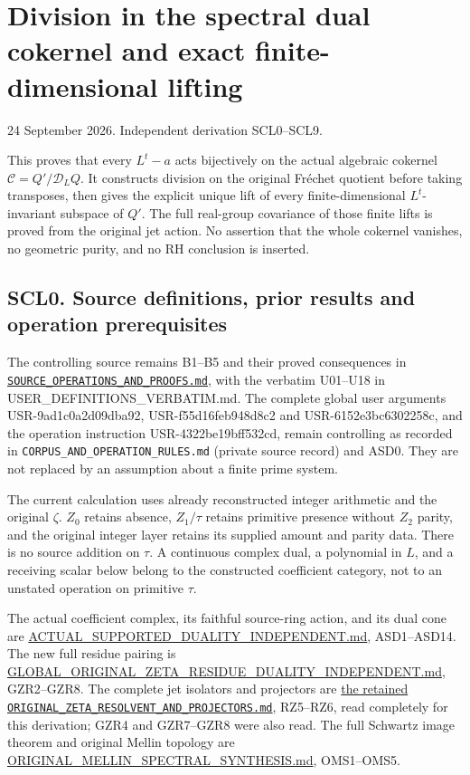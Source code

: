 \section{Division in the spectral dual cokernel and exact
finite-dimensional
lifting}\label{division-in-the-spectral-dual-cokernel-and-exact-finite-dimensional-lifting}

24 September 2026. Independent derivation SCL0--SCL9.

This proves that every \(L^t-a\) acts bijectively on the actual
algebraic cokernel \(\mathscr C=Q'/\mathcal D_LQ\). It constructs
division on the original Fréchet quotient before taking transposes, then
gives the explicit unique lift of every finite-dimensional
\(L^t\)-invariant subspace of \(Q'\). The full real-group covariance of
those finite lifts is proved from the original jet action. No assertion
that the whole cokernel vanishes, no geometric purity, and no RH
conclusion is inserted.

\subsection{SCL0. Source definitions, prior results and operation
prerequisites}\label{scl0.-source-definitions-prior-results-and-operation-prerequisites}

The controlling source remains B1--B5 and their proved consequences in
\href{../foundations/user_definitions_20260924/SOURCE_OPERATIONS_AND_PROOFS.md}{\nolinkurl{SOURCE_OPERATIONS_AND_PROOFS.md}},
with the verbatim U01--U18 in
{USER\_DEFINITIONS\_VERBATIM.md}.
The complete global user arguments USR-9ad1c0a2d09dba92,
USR-f55d16feb948d8c2 and USR-6152e3bc6302258c, and the operation
instruction USR-4322be19bff532cd, remain controlling as recorded in
\nolinkurl{CORPUS_AND_OPERATION_RULES.md} (private source record) and ASD0. They are not replaced by
an assumption about a finite prime system.

The current calculation uses already reconstructed integer arithmetic
and the original \(\zeta\). \(Z_0\) retains absence, \(Z_1/\tau\)
retains primitive presence without \(Z_2\) parity, and the original
integer layer retains its supplied amount and parity data. There is no
source addition on \(\tau\). A continuous complex dual, a polynomial in
\(L\), and a receiving scalar below belong to the constructed
coefficient category, not to an unstated operation on primitive
\(\tau\).

The actual coefficient complex, its faithful source-ring action, and its
dual cone are \url{ACTUAL_SUPPORTED_DUALITY_INDEPENDENT.md},
ASD1--ASD14. The new full residue pairing is
\url{GLOBAL_ORIGINAL_ZETA_RESIDUE_DUALITY_INDEPENDENT.md}, GZR2--GZR8.
The complete jet isolators and projectors are
\href{https://github.com/KokunoYumeto/zeta-function-research-reader/blob/main/workbenches/splitzero-tandem/continuations/20260924-cohomology-weight-and-character-lifts/gct-weight-control/proofs/ORIGINAL_ZETA_RESOLVENT_AND_PROJECTORS.md}{the
retained \nolinkurl{ORIGINAL_ZETA_RESOLVENT_AND_PROJECTORS.md}}, RZ5--RZ6, read
completely for this derivation; GZR4 and GZR7--GZR8 were also read. The
full Schwartz image theorem and original Mellin topology are
\url{ORIGINAL_MELLIN_SPECTRAL_SYNTHESIS.md}, OMS1--OMS5.

